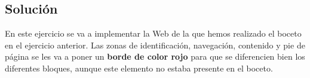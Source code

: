 \subsection{Solución}
En este ejercicio se va a implementar la Web de la que hemos realizado el boceto en el ejercicio anterior. Las zonas de identificación, navegación, contenido y pie de página se les va a poner un \textbf{borde de color rojo} para que se diferencien bien los diferentes bloques, aunque este elemento no estaba presente en el boceto.





%
%

